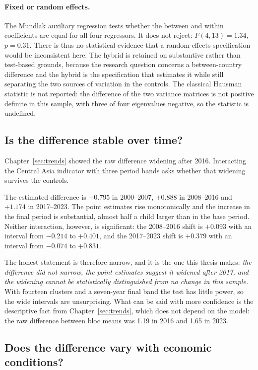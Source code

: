 \paragraph{Fixed or random effects.} The Mundlak auxiliary regression tests whether the between and within coefficients are equal for all four regressors. It does not reject: $F(4,13) = 1.34$, $p = 0.31$. There is thus no statistical evidence that a random-effects specification would be inconsistent here. The hybrid is retained on substantive rather than test-based grounds, because the research question concerns a between-country difference and the hybrid is the specification that estimates it while still separating the two sources of variation in the controls. The classical Hausman statistic is not reported: the difference of the two variance matrices is not positive definite in this sample, with three of four eigenvalues negative, so the statistic is undefined.

\subsection{Is the difference stable over time?}
\label{sec:stability}

Chapter~\ref{sec:trends} showed the raw difference widening after 2016. Interacting the Central Asia indicator with three period bands asks whether that widening survives the controls.

The estimated difference is $+0.795$ in 2000--2007, $+0.888$ in 2008--2016 and $+1.174$ in 2017--2023. The point estimates rise monotonically and the increase in the final period is substantial, almost half a child larger than in the base period. Neither interaction, however, is significant: the 2008--2016 shift is $+0.093$ with an interval from $-0.214$ to $+0.401$, and the 2017--2023 shift is $+0.379$ with an interval from $-0.074$ to $+0.831$.

The honest statement is therefore narrow, and it is the one this thesis makes: \emph{the difference did not narrow, the point estimates suggest it widened after 2017, and the widening cannot be statistically distinguished from no change in this sample.} With fourteen clusters and a seven-year final band the test has little power, so the wide intervals are unsurprising. What can be said with more confidence is the descriptive fact from Chapter~\ref{sec:trends}, which does not depend on the model: the raw difference between bloc means was 1.19 in 2016 and 1.65 in 2023.

\subsection{Does the difference vary with economic conditions?}
\label{sec:interactions}

